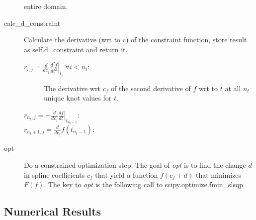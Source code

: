 \documentclass[11pt]{article}
\begin{document}
\begin{description}
  entire domain.  
\item[calc\_d\_constraint] Calculate the derivative (wrt to c) of the
  constraint function, store result as self.d\_constraint and return
  it.
  \begin{description}
  \item[$r_{i,j} = \frac{d}{d c_j} \left. \frac{d^2 f}{d t^2}
    \right|_{t_i}~\forall i < n_t$:]
    The derivative wrt $c_f$ of the second derivative of $f$ wrt to
    $t$ at all $n_t$ unique knot values for $t$.
\item[$r_{n_t,j} = - \frac{d}{d c_j} \left. \frac{d f}{d t}
    \right|_{t_{n_{t}-1}}$:]
  \item[$r_{n_t+1,j} = \frac{d}{d c_j} f(t_{n_{t}-1})$:]
  \end{description}
\item[opt] Do a constrained optimization step.
  The goal of \emph{opt} is to find the change $d$ in spline
  coefficients $c_f$ that yield a function $f(c_f+d)$ that minimizes $F(f)$.
  The key to \emph{opt} is the following call to
  scipy.optimize.fmin\_slsqp
  
\end{description}

\subsection{Numerical Results}
\label{sec:numerical-results}
\end{document}
